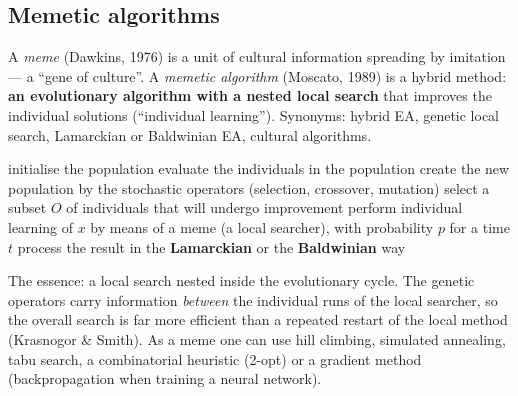 \documentclass[11pt,a4paper]{article}
\theoremstyle{definition}
\providecommand{\uv}[1]{``#1''}
\begin{document}
\subsection{Memetic algorithms}

\begin{defbox}
A \emph{meme} (Dawkins, 1976) is a unit of cultural information spreading by
imitation --- a \uv{gene of culture}. A \emph{memetic algorithm} (Moscato, 1989)
is a hybrid method: \textbf{an evolutionary algorithm with a nested local
search} that improves the individual solutions (\uv{individual learning}).
Synonyms: hybrid EA, genetic local search, Lamarckian or Baldwinian EA, cultural
algorithms.
\end{defbox}

\begin{algorithm}[!ht]
\caption{Memetic algorithm}
\begin{algorithmic}[1]
\State initialise the population
  \State evaluate the individuals in the population
  \State create the new population by the stochastic operators (selection, crossover, mutation)
  \State select a subset $O$ of individuals that will undergo improvement
    \State perform individual learning of $x$ by means of a meme (a local searcher),
      with probability $p$ for a time $t$
    \State process the result in the \textbf{Lamarckian} or the \textbf{Baldwinian} way
  \EndFor
\EndWhile
\end{algorithmic}
\end{algorithm}

The essence: a local search nested inside the evolutionary cycle. The genetic
operators carry information \emph{between} the individual runs of the local
searcher, so the overall search is far more efficient than a repeated restart of
the local method (Krasnogor \& Smith). As a meme one can use hill climbing,
simulated annealing, tabu search, a combinatorial heuristic (2-opt) or a
gradient method (backpropagation when training a neural network).
\end{document}
